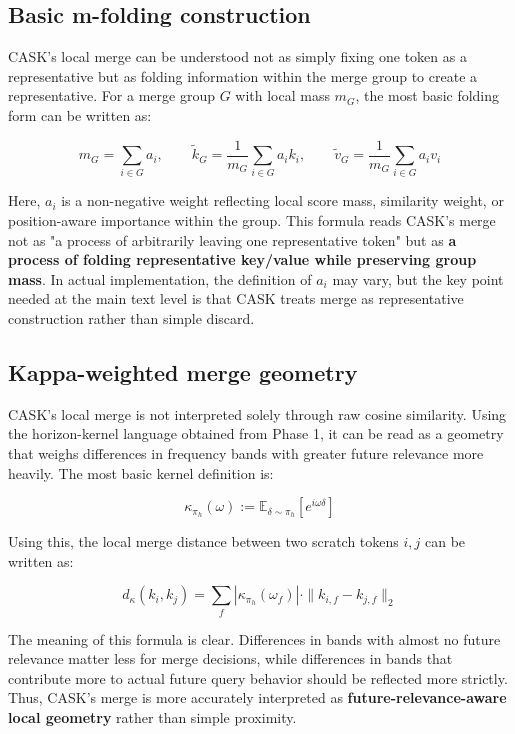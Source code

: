 \subsection{Basic m-folding construction}


CASK's local merge can be understood not as simply fixing one token as a representative but as folding information within the merge group to create a representative. For a merge group $G$ with local mass $m_G$, the most basic folding form can be written as:


$$
m_G = \sum_{i \in G} a_i,
\qquad
\tilde{k}_G = \frac{1}{m_G} \sum_{i \in G} a_i k_i,
\qquad
\tilde{v}_G = \frac{1}{m_G} \sum_{i \in G} a_i v_i
$$


Here, $a_i$ is a non-negative weight reflecting local score mass, similarity weight, or position-aware importance within the group. This formula reads CASK's merge not as "a process of arbitrarily leaving one representative token" but as \textbf{a process of folding representative key/value while preserving group mass}. In actual implementation, the definition of $a_i$ may vary, but the key point needed at the main text level is that CASK treats merge as representative construction rather than simple discard.


\subsection{Kappa-weighted merge geometry}


CASK's local merge is not interpreted solely through raw cosine similarity. Using the horizon-kernel language obtained from Phase 1, it can be read as a geometry that weighs differences in frequency bands with greater future relevance more heavily. The most basic kernel definition is:


$$
\kappa_{\pi_h}(\omega)
:=
\mathbb{E}_{\delta \sim \pi_h}
\left[e^{i\omega\delta}\right]
$$


Using this, the local merge distance between two scratch tokens $i, j$ can be written as:


$$
d_{\kappa}(k_i, k_j)
=
\sum_f
\left|\kappa_{\pi_h}(\omega_f)\right|
\cdot
\|k_{i,f} - k_{j,f}\|_2
$$


The meaning of this formula is clear. Differences in bands with almost no future relevance matter less for merge decisions, while differences in bands that contribute more to actual future query behavior should be reflected more strictly. Thus, CASK's merge is more accurately interpreted as \textbf{future-relevance-aware local geometry} rather than simple proximity.


